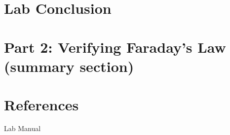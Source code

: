\documentclass[11pt]{article}
\let\oldsection\section
\renewcommand\section{\clearpage\oldsection}
\begin{document}
    \section{Lab Conclusion}\label{sec:lab_conclusion}


    

    \section{Part 2: Verifying Faraday’s Law (summary section)}\label{sec:part_2}


    \appendix
    \section{References}\label{sec:references}

    Lab Manual
\end{document}
